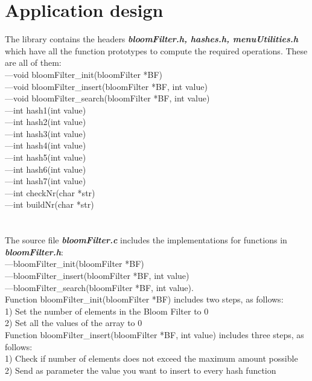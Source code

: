 \documentclass[14pt]{article}
\begin{document}
\section*{Application design}
\vspace{10 mm}
The library contains the headers \textbf{\textit{bloomFilter.h, hashes.h, menuUtilities.h}} which have all the function prototypes to compute the required operations. These are all of them:
\\---void bloomFilter\_init(bloomFilter *BF)
\\---void bloomFilter\_insert(bloomFilter *BF, int value)
\\---void bloomFilter\_search(bloomFilter *BF, int value)
\\---int hash1(int value)
\\---int hash2(int value)
\\---int hash3(int value)
\\---int hash4(int value)
\\---int hash5(int value)
\\---int hash6(int value)
\\---int hash7(int value)
\\---int checkNr(char *str)
\\---int buildNr(char *str)
\\
\\\vspace{3 mm}
\\The source file \textbf{\textit{bloomFilter.c}} includes the implementations for functions in \textbf{\textit{bloomFilter.h}}:  
\\---bloomFilter\_init(bloomFilter *BF)
\\---bloomFilter\_insert(bloomFilter *BF, int value)
\\---bloomFilter\_search(bloomFilter *BF, int value).
\\Function bloomFilter\_init(bloomFilter *BF) includes two steps, as follows:
\\1) Set the number of elements in the Bloom Filter to 0
\\2) Set all the values of the array to 0
\vspace{2 mm}
\\Function bloomFilter\_insert(bloomFilter *BF, int value) includes three steps, as follows:
\\1) Check if number of elements does not exceed the maximum amount possible
\\2) Send as parameter the value you want to insert to every hash function
\end{document}

